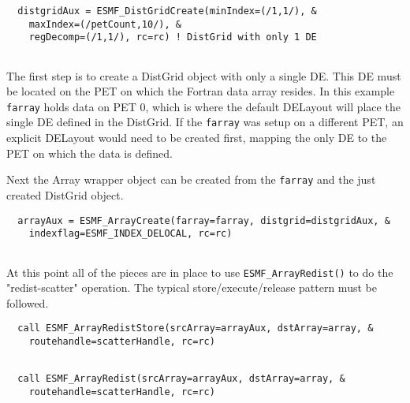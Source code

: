 
 \begin{verbatim}
  distgridAux = ESMF_DistGridCreate(minIndex=(/1,1/), &
    maxIndex=(/petCount,10/), &
    regDecomp=(/1,1/), rc=rc) ! DistGrid with only 1 DE
 
\end{verbatim}
 

   The first step is to create a DistGrid object with only a single DE. This
   DE must be located on the PET on which the Fortran data array resides.
   In this example {\tt farray} holds data on PET 0, which is where the default
   DELayout will place the single DE defined in the DistGrid. If the {\tt farray}
   was setup on a different PET, an explicit DELayout would need to be created
   first, mapping the only DE to the PET on which the data is defined.
  
   Next the Array wrapper object can be created from the {\tt farray} and the
   just created DistGrid object. 

 \begin{verbatim}
  arrayAux = ESMF_ArrayCreate(farray=farray, distgrid=distgridAux, &
    indexflag=ESMF_INDEX_DELOCAL, rc=rc)
 
\end{verbatim}
 

   At this point all of the pieces are in place to use {\tt ESMF\_ArrayRedist()}
   to do the "redist-scatter" operation. The typical store/execute/release
   pattern must be followed. 

 \begin{verbatim}
  call ESMF_ArrayRedistStore(srcArray=arrayAux, dstArray=array, &
    routehandle=scatterHandle, rc=rc)
 
\end{verbatim}
 

 \begin{verbatim}
  call ESMF_ArrayRedist(srcArray=arrayAux, dstArray=array, &
    routehandle=scatterHandle, rc=rc)
 
\end{verbatim}
 
